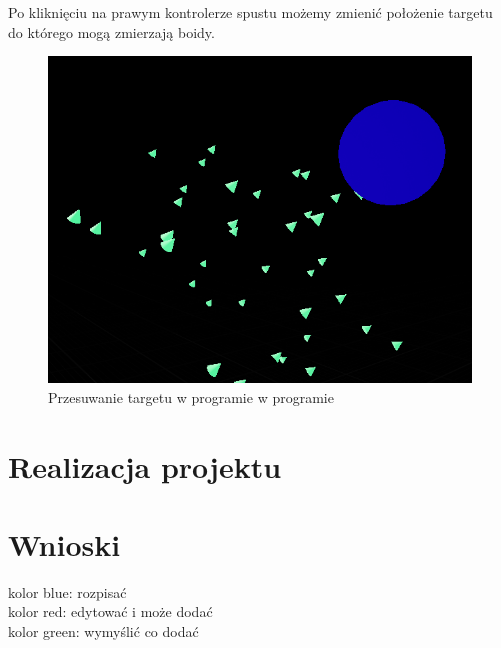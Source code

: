 \documentclass[a4paper,12pt,reqno]{article}
\begin{document}
Po kliknięciu na prawym kontrolerze spustu możemy zmienić położenie targetu do którego mogą zmierzają boidy.

\begin{figure}[H]%
\centering
\includegraphics[width=0.7\columnwidth]{graphics/boids/BoidsInUE.png}
\caption{Przesuwanie targetu w programie w programie
\label{BPExample}}%
%
\qquad
\end{figure}  

\newpage
\section{Realizacja projektu}

\newpage
\section{Wnioski}


\newpage




{\color{blue} kolor blue: rozpisać}\\
{\color{red} kolor red: edytować i może dodać}\\
{\color{green} kolor green: wymyślić co dodać}
\end{document}
